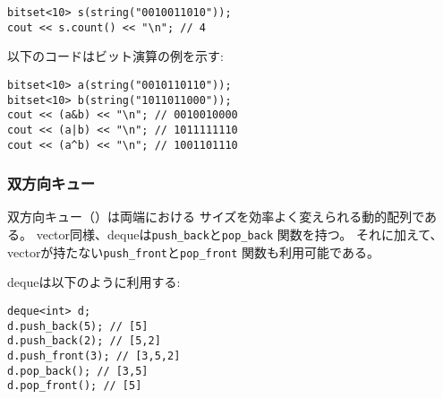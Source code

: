 \begin{lstlisting}
bitset<10> s(string("0010011010"));
cout << s.count() << "\n"; // 4
\end{lstlisting}

\begin{comment}
The following code shows examples of using bit operations:
\end{comment}

以下のコードはビット演算の例を示す:
\begin{lstlisting}
bitset<10> a(string("0010110110"));
bitset<10> b(string("1011011000"));
cout << (a&b) << "\n"; // 0010010000
cout << (a|b) << "\n"; // 1011111110
cout << (a^b) << "\n"; // 1001101110
\end{lstlisting}

\begin{comment}
\subsubsection{Deque}

\index{deque}

A \key{deque} is a dynamic array
whose size can be efficiently
changed at both ends of the array.
Like a vector, a deque provides the functions
\texttt{push\_back} and \texttt{pop\_back}, but
it also includes the functions
\texttt{push\_front} and \texttt{pop\_front}
which are not available in a vector.

A deque can be used as follows:
\end{comment}

\subsubsection{双方向キュー}


双方向キュー（）は両端における
サイズを効率よく変えられる動的配列である。
vector同様、dequeは\texttt{push\_back}と\texttt{pop\_back}
関数を持つ。
それに加えて、vectorが持たない\texttt{push\_front}と\texttt{pop\_front}
関数も利用可能である。

dequeは以下のように利用する:
\begin{lstlisting}
deque<int> d;
d.push_back(5); // [5]
d.push_back(2); // [5,2]
d.push_front(3); // [3,5,2]
d.pop_back(); // [3,5]
d.pop_front(); // [5]
\end{lstlisting}

\begin{comment}
The internal implementation of a deque
is more complex than that of a vector,
and for this reason, a deque is slower than a vector.
Still, both adding and removing
elements take $O(1)$ time on average at both ends.
\end{comment}

